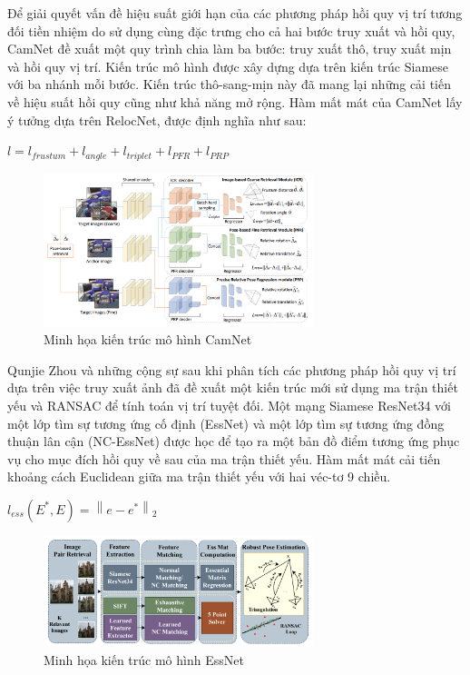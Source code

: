 Để giải quyết vấn đề hiệu suất giới hạn của các phương pháp hồi quy vị trí tương đối tiền nhiệm do sử dụng cùng đặc trưng cho cả hai bước truy xuất và hồi quy, CamNet \cite{9008579} đề xuất một quy trình chia làm ba bước: truy xuất thô, truy xuất mịn và hồi quy vị trí. Kiến trúc mô hình được xây dựng dựa trên kiến trúc Siamese với ba nhánh mỗi bước. Kiến trúc thô-sang-mịn này đã mang lại những cải tiến về hiệu suất hồi quy cũng như khả năng mở rộng. Hàm mất mát của CamNet lấy ý tưởng dựa trên RelocNet, được định nghĩa như sau:
\begin{center}
$l = l_{frustum} + l_{angle} + l_{triplet} + l_{PFR} + l_{PRP}$
\end{center}
\begin{figure}[H]
    \centering
    \includegraphics[width=0.7\textwidth]{pics/Chapter2/camnet.png}
    \caption{Minh họa kiến trúc mô hình CamNet \cite{9008579}}
\end{figure}
Qunjie Zhou và những cộng sự \cite{zhou2020learn} sau khi phân tích các phương pháp hồi quy vị trí dựa trên việc truy xuất ảnh đã đề xuất một kiến trúc mới sử dụng ma trận thiết yếu và RANSAC để tính toán vị trí tuyệt đối. Một mạng Siamese ResNet34 với một lớp tìm sự tương ứng cố định (EssNet) và một lớp tìm sự tương ứng đồng thuận lân cận (NC-EssNet) được học để tạo ra một bản đồ điểm tương ứng phục vụ cho mục đích hồi quy về sau của ma trận thiết yếu. Hàm mất mát cải tiến khoảng cách Euclidean giữa ma trận thiết yếu với hai véc-tơ 9 chiều.
\begin{center}
$l_{ess}(E^*, E) = \left \| e - e^* \right \|_2$
\end{center}
\begin{figure}[H]
    \centering
    \includegraphics[width=0.7\textwidth]{pics/Chapter2/essnet.png}
    \caption{Minh họa kiến trúc mô hình EssNet \cite{zhou2020learn}}
\end{figure}

